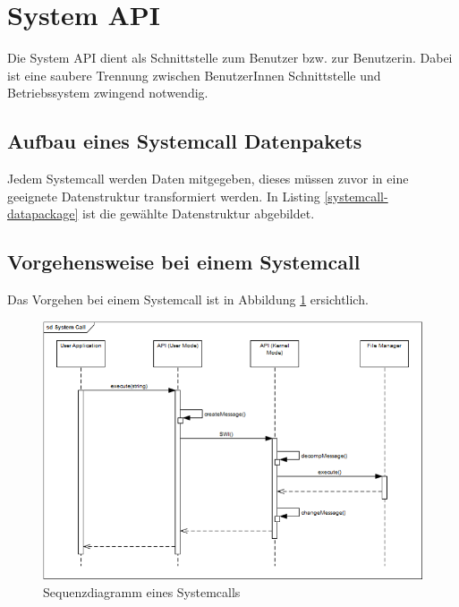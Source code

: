 \section{System API}
Die System API dient als Schnittstelle zum Benutzer bzw. zur Benutzerin. Dabei ist eine saubere Trennung zwischen BenutzerInnen Schnittstelle und Betriebssystem zwingend notwendig.

\subsection{Aufbau eines Systemcall Datenpakets}
Jedem Systemcall werden Daten mitgegeben, dieses müssen zuvor in eine geeignete Datenstruktur transformiert werden. In Listing \ref{systemcall-datapackage} ist die gewählte Datenstruktur abgebildet.




\subsection{Vorgehensweise bei einem Systemcall}
Das Vorgehen bei einem Systemcall ist in Abbildung \ref{fig:Sequencediagram-systemcall} ersichtlich. 

\begin{figure}[H]
	\includegraphics[scale=0.70]{chapters/systemapi/figures/systemcall-sequence-diagram}
	\caption{Sequenzdiagramm eines Systemcalls}
	\label{fig:Sequencediagram-systemcall}
\end{figure}

\pagebreak 